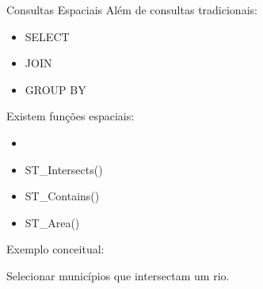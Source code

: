\documentclass{beamer}
\begin{document}
\begin{frame}{Consultas Espaciais}
    Além de consultas tradicionais:
    
    \begin{itemize}
        \item SELECT
        \item JOIN
        \item GROUP BY
    \end{itemize}
    
    \vspace{0.4cm}
    
    Existem funções espaciais:
    
    \begin{itemize}
        \item {}
        \item ST\_Intersects()
        \item ST\_Contains()
        \item ST\_Area()
    \end{itemize}
    
    \vspace{0.4cm}
    
    Exemplo conceitual:
    \begin{center}
        Selecionar municípios que intersectam um rio.
    \end{center}
\end{frame}
\end{document}
